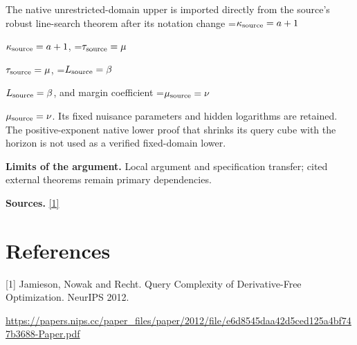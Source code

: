 \documentclass[10pt,a4paper]{article}
\newcommand{\AtlasMath}[1]{\par\begingroup\centering\setbox0=\hbox{$\displaystyle #1$}\ifdim\wd0>1.4\linewidth\typeout{ATLAS WIDE FORMULA: \the\wd0}\fi\ifdim\wd0>\linewidth\resizebox{\linewidth}{!}{\box0}\else\box0\fi\par\endgroup}
\newcommand{\AtlasInlineMath}[1]{\begingroup\setbox0=\hbox{$#1$}\ifdim\wd0>.4\linewidth\endgroup\AtlasMath{#1}\else\endgroup$#1$\fi}
\begin{document}
The native unrestricted-domain upper is imported directly from the source's robust line-search theorem after its notation change \AtlasInlineMath{\kappa_{\rm source}=a+1}, \AtlasInlineMath{\tau_{\rm source}=\mu}, \AtlasInlineMath{L_{\rm source}=\beta}, and margin coefficient \AtlasInlineMath{\mu_{\rm source}=\nu}. Its fixed nuisance parameters and hidden logarithms are retained. The positive-exponent native lower proof that shrinks its query cube with the horizon is not used as a verified fixed-domain lower.

\textbf{Limits of the argument.} Local argument and specification transfer; cited external theorems remain primary dependencies.

\textbf{Sources.} \href{https://papers.nips.cc/paper_files/paper/2012/file/e6d8545daa42d5ced125a4bf747b3688-Paper.pdf}{[1]}

\section{References}
[1] Jamieson, Nowak and Recht. Query Complexity of Derivative-Free Optimization. NeurIPS 2012.

\url{https://papers.nips.cc/paper_files/paper/2012/file/e6d8545daa42d5ced125a4bf747b3688-Paper.pdf}
\end{document}
